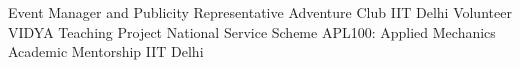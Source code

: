 

\begin{cventries}

  \cventry
    {Event Manager and Publicity Representative} %
    {Adventure Club} %
    {IIT Delhi} %
    {} %
    {
    }
\vspace{-3mm}
  \cventry
    {Volunteer} %
    {VIDYA Teaching Project} %
    {National Service Scheme} %
    {} %
    {}
\vspace{-3mm}
  \cventry
    {APL100: Applied Mechanics} %
    {Academic Mentorship} %
    {IIT Delhi} %
    {} %
    {}
\end{cventries}
